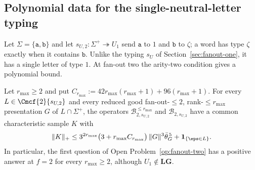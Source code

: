 
\subsection{Polynomial data for the single-neutral-letter typing}
\label{subsec:binary-u1}

Let $\Sigma=\{\mathtt a,\mathtt b\}$ and let $s_{U,2}:\Sigma^+\twoheadrightarrow U_1$
send $\mathtt a$ to $1$ and $\mathtt b$ to $\zeta$; a word has type $\zeta$ exactly
when it contains $\mathtt b$.  Unlike the typing $s_U$ of
Section~\ref{sec:fanout-one}, it has a single letter of type $1$.  At fan-out two
the arity-two condition gives a polynomial bound.

\begin{theorem}
\label{thm:binary-u1-polydata}
Let $r_{\max}\ge2$ and put
$C_{r_{\max}}:=42r_{\max}(r_{\max}+1)+96(r_{\max}+1)$.  For every
$L\in\Cmcf{2}{s_{U,2}}$ and every reduced good fan-out-$\le2$,
rank-$\le r_{\max}$ presentation $G$ of $L\cap\Sigma^+$, the operators
$\mathcal B^{\le r_{\max}}_{2,s_{U,2}}$ and $\mathcal B_{2,s_{U,2}}$ have a common
characteristic sample $K$ with
\[
 \|K\|_+\le 3^{2r_{\max}}\bigl(3+r_{\max}C_{r_{\max}}\bigr)\,
 \|G\|^3\bar\theta_G^{\,5}+\mathbf 1_{\{\eps\in L\}}.
\]
In particular, the first question of Open Problem~\ref{op:fanout-two} has a
positive answer at $f=2$ for every $r_{\max}\ge2$, although
$U_1\notin\mathbf{LG}$.
\end{theorem}

